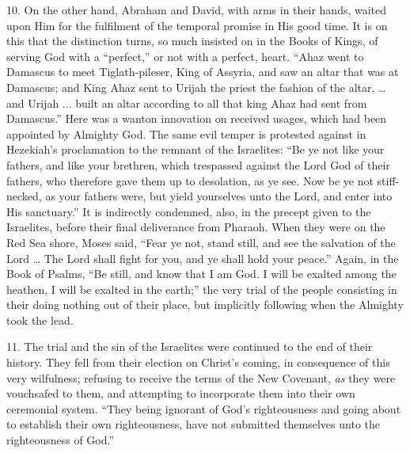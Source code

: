 10. On the other hand, Abraham and David, with arms in their hands,
waited upon Him for the fulfilment of the temporal promise in His good
time. It is on this that the distinction turns, so much insisted on in
the Books of Kings, of serving God with a ``perfect,'' or not
with a perfect, heart. ``Ahaz went to Damascus to meet
Tiglath-pileser, King of Assyria, and saw an altar that was at
Damascus; and King Ahaz sent to Urijah the priest the fashion of the
altar, … and Urijah ... built an altar according to all that king
Ahaz had sent from Damascus.'' Here was a wanton innovation on
received usages, which had been appointed by Almighty God. The same
evil temper is protested against in Hezekiah's proclamation to the
remnant of the Israelites: ``Be ye not like your fathers, and like
your brethren, which trespassed against the Lord God of their fathers,
who therefore gave them up to desolation, as ye see. Now be ye not
stiff-necked, as your fathers were, but yield yourselves unto the
Lord, and enter into His sanctuary.'' It is indirectly condemned,
also, in the precept given to the Israelites, before their final
deliverance from Pharaoh. When they were on the Red Sea shore, Moses
said, ``Fear ye not, stand still, and see the salvation of the
Lord … The Lord shall fight for you, and ye shall hold your
peace.'' Again, in the Book of Psalms, ``Be still, and know
that I am God. I will be exalted among the heathen, I will be exalted
in the earth;'' the very trial of the people consisting in their
doing nothing out of their place, but implicitly following when the
Almighty took the lead.

11. The trial and the sin of the Israelites were continued to the
end of their history. They fell from their election on Christ's
coming, in consequence of this very wilfulness; refusing to receive
the terms of the New Covenant, \emph{as} they were vouchsafed to them, and
attempting to incorporate them into their own ceremonial system.
``They being ignorant of God's righteousness and going about to
establish their own righteousness, have not submitted themselves unto
the righteousness of God.''

